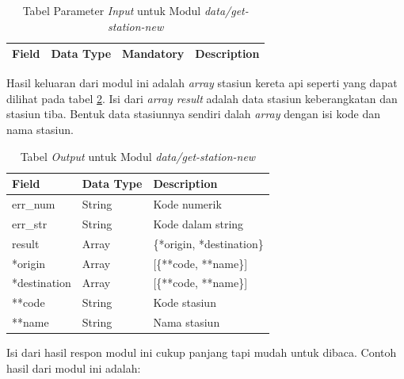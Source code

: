 \begin{table}[H]
	\centering 
	\caption{Tabel Parameter \textit{Input} untuk Modul \textit{data/get-station-new}}
	\label{tab:getstationinput}
	\begin{tabular}{|l|l|l|l|}
		\hline
		Field & Data Type & Mandatory & Description\\
		\hline
		
	\end{tabular} 
\end{table}

Hasil keluaran dari modul ini adalah \textit{array} stasiun kereta api seperti yang dapat dilihat pada tabel \ref{tab:getstationoutput}. Isi dari \textit{array result} adalah data stasiun keberangkatan dan stasiun tiba. Bentuk data stasiunnya sendiri dalah \textit{array} dengan isi kode dan nama stasiun.

\begin{table}[H]
	\centering 
	\caption{Tabel \textit{Output} untuk Modul \textit{data/get-station-new}}
	\label{tab:getstationoutput}
	\begin{tabular}{|l|l|p{8cm}|}
		\hline
		Field & Data Type & Description\\
		\hline

		\hline
        err\_num & String & Kode numerik\\
        \hline
        err\_str & String & Kode dalam string\\
        \hline
        result & Array & \{*origin, *destination\}\\
        \hline
        \hline
        *origin & Array & [\{**code, **name\}]\\
        \hline
        *destination & Array & [\{**code, **name\}]\\
        \hline
        **code & String & Kode stasiun\\
        \hline
        **name & String & Nama stasiun\\
        \hline
		
	\end{tabular} 
\end{table}


Isi dari hasil respon modul ini cukup panjang tapi mudah untuk dibaca. Contoh hasil dari modul ini adalah:

